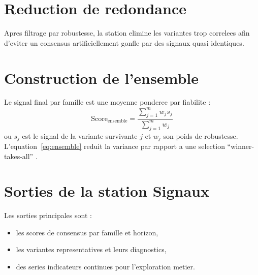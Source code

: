\section{Reduction de redondance}
Apres filtrage par robustesse, la station elimine les variantes trop correlees
afin d'eviter un consensus artificiellement gonfle par des signaux quasi
identiques.

\section{Construction de l'ensemble}
Le signal final par famille est une moyenne ponderee par fiabilite :
\begin{equation}
\text{Score}_{\text{ensemble}} = \frac{\sum_{j=1}^{m} w_j s_j}{\sum_{j=1}^{m} w_j}
\label{eq:ensemble}
\end{equation}
ou $s_j$ est le signal de la variante survivante $j$ et $w_j$ son poids de
robustesse. L'equation~\ref{eq:ensemble} reduit la variance par rapport a une
selection ``winner-takes-all'' \cite{deprado2018}.

\section{Sorties de la station Signaux}
Les sorties principales sont :
\begin{itemize}
\item les scores de consensus par famille et horizon,
\item les variantes representatives et leurs diagnostics,
\item des series indicateurs continues pour l'exploration metier.
\end{itemize}
